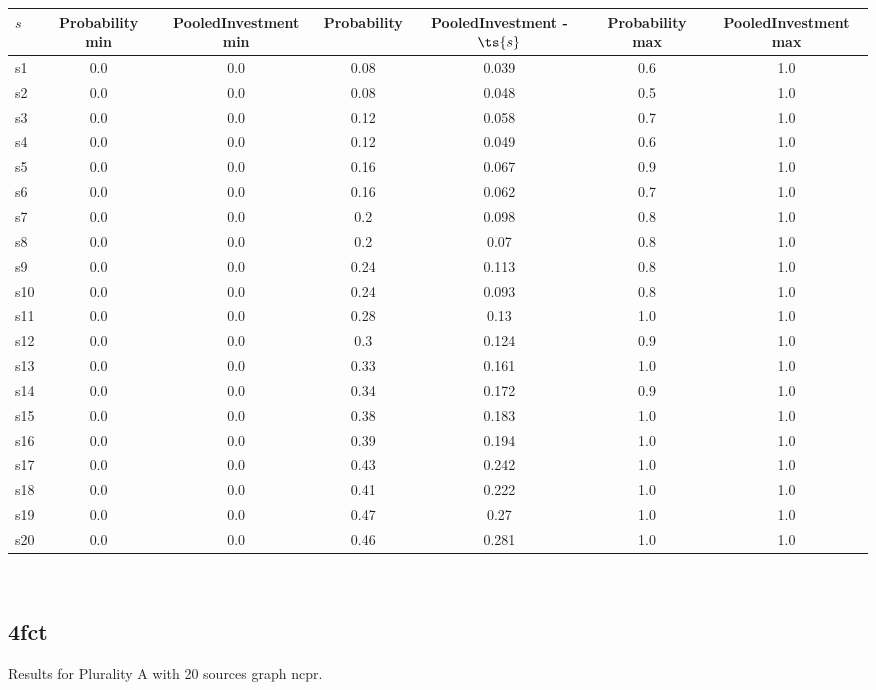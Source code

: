 \documentclass{article}
\begin{document}
\noindent\begin{tabular}{|l|c|c|c|c|c|c|}
\hline
$s$& Probability min & PooledInvestment min & Probability & PooledInvestment - $\ts{s}$ & Probability max & PooledInvestment max\\
\hline
s1 &0.0 & 0.0 & 0.08 & 0.039 & 0.6 & 1.0\\
\hline
s2 &0.0 & 0.0 & 0.08 & 0.048 & 0.5 & 1.0\\
\hline
s3 &0.0 & 0.0 & 0.12 & 0.058 & 0.7 & 1.0\\
\hline
s4 &0.0 & 0.0 & 0.12 & 0.049 & 0.6 & 1.0\\
\hline
s5 &0.0 & 0.0 & 0.16 & 0.067 & 0.9 & 1.0\\
\hline
s6 &0.0 & 0.0 & 0.16 & 0.062 & 0.7 & 1.0\\
\hline
s7 &0.0 & 0.0 & 0.2 & 0.098 & 0.8 & 1.0\\
\hline
s8 &0.0 & 0.0 & 0.2 & 0.07 & 0.8 & 1.0\\
\hline
s9 &0.0 & 0.0 & 0.24 & 0.113 & 0.8 & 1.0\\
\hline
s10 &0.0 & 0.0 & 0.24 & 0.093 & 0.8 & 1.0\\
\hline
s11 &0.0 & 0.0 & 0.28 & 0.13 & 1.0 & 1.0\\
\hline
s12 &0.0 & 0.0 & 0.3 & 0.124 & 0.9 & 1.0\\
\hline
s13 &0.0 & 0.0 & 0.33 & 0.161 & 1.0 & 1.0\\
\hline
s14 &0.0 & 0.0 & 0.34 & 0.172 & 0.9 & 1.0\\
\hline
s15 &0.0 & 0.0 & 0.38 & 0.183 & 1.0 & 1.0\\
\hline
s16 &0.0 & 0.0 & 0.39 & 0.194 & 1.0 & 1.0\\
\hline
s17 &0.0 & 0.0 & 0.43 & 0.242 & 1.0 & 1.0\\
\hline
s18 &0.0 & 0.0 & 0.41 & 0.222 & 1.0 & 1.0\\
\hline
s19 &0.0 & 0.0 & 0.47 & 0.27 & 1.0 & 1.0\\
\hline
s20 &0.0 & 0.0 & 0.46 & 0.281 & 1.0 & 1.0\\
\hline
\end{tabular}\\

\newpage

\subsection{4fct}

\noindent Results for Plurality A with 20 sources graph ncpr.
\end{document}
